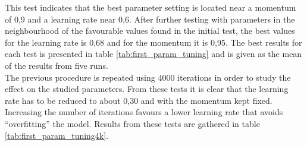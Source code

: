 This test indicates that the best parameter setting is located near a momentum of 0,9 and a learning rate near 0,6. After further testing with parameters in the neighbourhood of the favourable values found in the initial test, the best values for the learning rate is 0,68 and for the momentum it is 0,95. The best results for each test is presented in table \ref{tab:first_param_tuning} and is given as the mean of the results from five runs. 
\\
The previous procedure is repeated using 4000 iterations in order to study the effect on the studied parameters. From these tests it is clear that the learning rate has to be reduced to about 0,30 and with the momentum kept fixed. Increasing the number of iterations favours a lower learning rate that avoids ``overfitting'' the model. Results from these tests are gathered in table \ref{tab:first_param_tuning4k}.  


